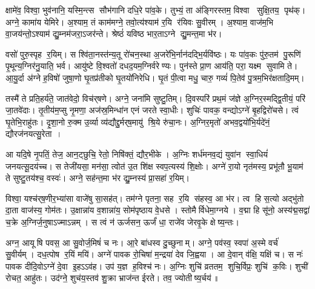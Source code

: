 क्षामे॑व॒ विश्वा॒ भुव॑नानि॒ यस्मि॒न्त्स सौभ॑गानि दधि॒रे पा॑व॒के। तुभ्यं॒ ता अ॑ङ्गिरस्तम॒ विश्वा सुक्षि॒तय॒ पृथ॑क्। अग्ने॒ कामा॑य येमिरे। अ॒श्याम॒ तं काम॑मग्ने॒ तवो॒त्य॑श्याम॑ र॒यि र॑यिवः सु॒वीरम्। अ॒श्याम॒ वाज॑म॒भि वा॒जय॑न्तो॒ऽश्याम॑ द्यु॒म्नम॑जरा॒ऽजर॑न्ते। श्रेष्ठं॑ यविष्ठ भार॒ताऽग्ने द्यु॒मन्त॒मा भ॑र। 

वसो॑ पुरु॒स्पृह र॒यिम्। स श्वि॑ता॒नस्त॑न्य॒तू रो॑चन॒स्था अ॒जरे॑भि॒र्नान॑दद्भि॒र्यवि॑ष्ठः। यः पा॑व॒कः पु॑रु॒तम॑ पु॒रूणि॑ पृ॒थून्य॒ग्निर॑नु॒याति॒ भर्व\snn{}। आयु॑ष्टे वि॒श्वतो॑ दधद॒यम॒ग्निर्वरेण्यः। पुन॑स्ते प्रा॒ण आय॑ति॒ परा॒ यक्ष्म सुवामि ते। आ॒यु॒र्दा अ॑ग्ने ह॒विषो॑ जुषा॒णो घृ॒तप्र॑तीको घृ॒तयो॑निरेधि। घृ॒तं पी॒त्वा मधु॒ चारु॒ गव्यं॑ पि॒तेव॑ पु॒त्रम॒भिर॑क्षतादि॒मम्।

तस्मै॑ ते प्रति॒हर्य॑ते॒ जात॑वेदो॒ विच॑र्‌षणे। अग्ने॒ जना॑मि सुष्टु॒तिम्। दि॒वस्परि॑ प्रथ॒मं ज॑ज्ञे अ॒ग्निर॒स्मद्द्वि॒तीयं॒ परि॑ जा॒तवे॑दाः। तृ॒तीय॑म॒प्सु नृ॒मणा॒ अज॑स्र॒मिन्धा॑न एनं जरते स्वा॒धीः। शुचिः॑ पावक॒ वन्द्योऽग्ने॑ बृ॒हद्विरो॑चसे। त्वं घृ॒तेभि॒राहु॑तः। दृ॒शा॒नो रु॒क्म उ॒र्व्या व्य॑द्यौद्दु॒र्मर्‌ष॒मायु॑ श्रि॒ये रु॑चा॒नः। अ॒ग्निर॒मृतो॑ अभव॒द्वयो॑भि॒र्यदे॑नं॒ द्यौरज॑नयत्सु॒रेता। 

आ यदि॒षे नृ॒पतिं॒ तेज॒ आन॒ट्छुचि॒ रेतो॒ निषि॑क्तं॒ द्यौर॒भीके।
अ॒ग्निः शर्ध॑मनव॒द्यं युवा॑न स्वा॒धियं॑ जनयत्सू॒दय॑च्च। स तेजी॑यसा॒ मन॑सा॒ त्वोत॑ उ॒त शि॑क्ष स्वप॒त्यस्य॑ शि॒क्षोः। अग्ने॑ रा॒यो नृत॑मस्य॒ प्रभू॑तौ भू॒याम॑ ते सुष्टु॒तय॑श्च॒ वस्वः॑। अग्ने॒ सह॑न्त॒मा भ॑र द्यु॒म्नस्य॑ प्रा॒सहा॑ र॒यिम्।

 विश्वा॒ यश्च॑र्‌ष॒णीर॒भ्या॑सा वाजे॑षु सा॒सह॑त्। 
तम॑ग्ने पृतना॒ सह र॒यि स॑हस्व॒ आ भ॑र। त्व हि स॒त्यो अद्भु॑तो दा॒ता वाज॑स्य॒ गोम॑तः। उ॒क्षान्ना॑य व॒शान्ना॑य॒ सोम॑पृष्ठाय वे॒धसे। स्तोमैर्विधेमा॒ग्नये। व॒द्मा हि सू॑नो॒ अस्य॑द्म॒सद्वा॑ च॒क्रे अ॒ग्निर्ज॒नुषाऽज्माऽन्नम्। स त्वं न॑ ऊर्जसन॒ ऊर्जं॑ धा॒  राजे॑व जेरवृ॒के क्षेष्य॒न्तः।

अग्न॒ आयूषि पवस॒ आ सु॒वोर्ज॒मिषं॑ च नः। आ॒रे बा॑धस्व दु॒च्छुनाम्। अग्ने॒ पव॑स्व॒ स्वपा॑ अ॒स्मे वर्च॑ सु॒वीर्यम्। दध॒त्पोष र॒यिं मयि॑।
अग्ने॑ पावक रो॒चिषा॑ म॒न्द्रया॑ देव जि॒ह्वया। आ दे॒वान् व॑क्षि॒ यक्षि॑ च। स नः॑ पावक दीदि॒वोऽग्ने॑ दे॒वा इ॒हऽऽव॑ह। उप॑ य॒ज्ञ ह॒विश्च॑ नः। अ॒ग्निः शुचि॑ व्रततम॒ शुचि॒र्विप्रः॒ शुचि॑ क॒विः। शुची॑ रोचत॒ आहु॑तः। उद॑ग्ने॒ शुच॑य॒स्तव॑ शु॒क्रा भ्राज॑न्त ईरते। तव॒ ज्योतीष्य॒र्चय॑॥


